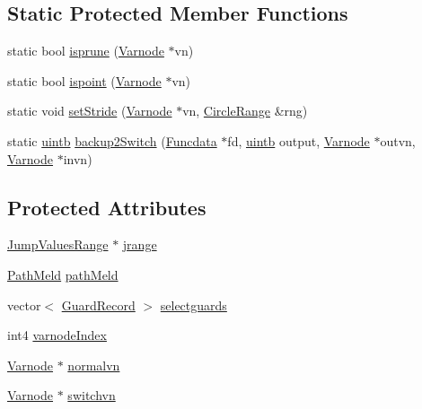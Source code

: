\subsection*{Static Protected Member Functions}
\begin{DoxyCompactItemize}
\item 
static bool \mbox{\hyperlink{class_jump_basic_adfafb975d3e72f1ebe55f8dd6544fd44}{isprune}} (\mbox{\hyperlink{class_varnode}{Varnode}} $\ast$vn)
\item 
static bool \mbox{\hyperlink{class_jump_basic_a1a00a767da59463a1b552a9fc6760156}{ispoint}} (\mbox{\hyperlink{class_varnode}{Varnode}} $\ast$vn)
\item 
static void \mbox{\hyperlink{class_jump_basic_a3cc7f57027e323fef2d68388cf2c470c}{set\+Stride}} (\mbox{\hyperlink{class_varnode}{Varnode}} $\ast$vn, \mbox{\hyperlink{class_circle_range}{Circle\+Range}} \&rng)
\item 
static \mbox{\hyperlink{types_8h_a2db313c5d32a12b01d26ac9b3bca178f}{uintb}} \mbox{\hyperlink{class_jump_basic_a0b60980f79f56d8425f2cd5c231ddc25}{backup2\+Switch}} (\mbox{\hyperlink{class_funcdata}{Funcdata}} $\ast$fd, \mbox{\hyperlink{types_8h_a2db313c5d32a12b01d26ac9b3bca178f}{uintb}} output, \mbox{\hyperlink{class_varnode}{Varnode}} $\ast$outvn, \mbox{\hyperlink{class_varnode}{Varnode}} $\ast$invn)
\end{DoxyCompactItemize}
\subsection*{Protected Attributes}
\begin{DoxyCompactItemize}
\item 
\mbox{\hyperlink{class_jump_values_range}{Jump\+Values\+Range}} $\ast$ \mbox{\hyperlink{class_jump_basic_a5a132a1f60bd90b67c7b1e7d8627656d}{jrange}}
\item 
\mbox{\hyperlink{class_path_meld}{Path\+Meld}} \mbox{\hyperlink{class_jump_basic_aade10e6498d3f6146674b7b9ae1938e5}{path\+Meld}}
\item 
vector$<$ \mbox{\hyperlink{class_guard_record}{Guard\+Record}} $>$ \mbox{\hyperlink{class_jump_basic_a226ae48889e18ba9998b42105d991d35}{selectguards}}
\item 
int4 \mbox{\hyperlink{class_jump_basic_ae8f3090bdd209f55abad455b758438ac}{varnode\+Index}}
\item 
\mbox{\hyperlink{class_varnode}{Varnode}} $\ast$ \mbox{\hyperlink{class_jump_basic_ab2aa4072b79d87215a6aeb27aa8d4464}{normalvn}}
\item 
\mbox{\hyperlink{class_varnode}{Varnode}} $\ast$ \mbox{\hyperlink{class_jump_basic_a3eba94be92b13b5a0a0fbc85bdb26146}{switchvn}}
\end{DoxyCompactItemize}


